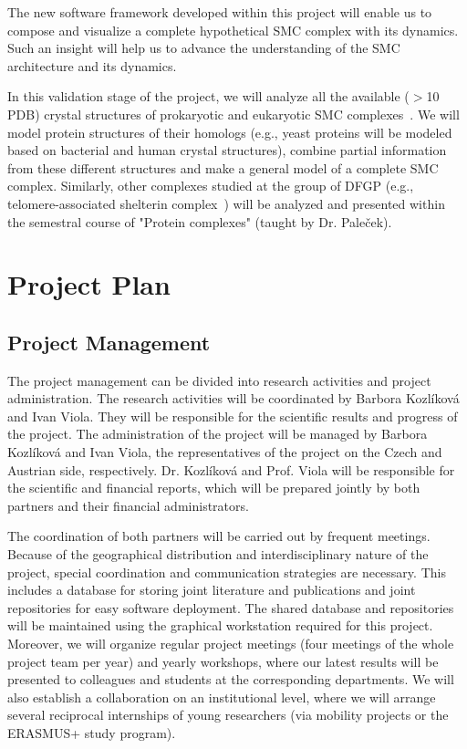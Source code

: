 \documentclass[11pt,a4paper,titlepage,oneside,onecolumn]{article}
\begin{document}
The new software framework developed within this project will enable us to compose and visualize a complete hypothetical SMC complex with its dynamics. 
Such an insight will help us to advance the understanding of the SMC architecture and its dynamics.
 
In this validation stage of the project, we will analyze all the available ($>$10 PDB) crystal structures of prokaryotic and eukaryotic SMC complexes~\cite{Palecek2015}. 
We will model protein structures of their homologs (e.g., yeast proteins will be modeled based on bacterial and human crystal structures), combine partial information from these different structures and make a general model of a complete SMC complex. 
Similarly, other complexes studied at the group of DFGP (e.g., telomere-associated shelterin complex~\cite{Janouskova2015,Schrumpfova}) will be analyzed and presented within the semestral course of "Protein complexes" (taught by Dr. Pale\v{c}ek).




\section{Project Plan}

\subsection{Project Management}
The project management can be divided into research activities and project administration.
The research activities will be coordinated by Barbora Kozl\'{i}kov\'{a} and Ivan Viola. 
They will be responsible for the scientific results and progress of the project.
The administration of the project will be managed by Barbora Kozl\'{i}kov\'{a} and Ivan Viola, the representatives of the project on the Czech and Austrian side, respectively. 
Dr. Kozl\'{i}kov\'{a} and Prof. Viola will be responsible for the scientific and financial reports, which will be prepared jointly by both partners and their financial administrators. 

The coordination of both partners will be carried out by frequent meetings. 
Because of the geographical distribution and interdisciplinary nature of the project, special coordination and communication strategies are necessary. 
This includes a database for storing joint literature and publications and joint repositories for easy software deployment. 
The shared database and repositories will be maintained using the graphical workstation required for this project. 
Moreover, we will organize regular project meetings (four meetings of the whole project team per year) and yearly workshops, where our latest results will be presented to colleagues and students at the corresponding departments. 
We will also establish a collaboration on an institutional level, where we will arrange several reciprocal internships of young researchers (via mobility projects or the ERASMUS+ study program). 
 
\end{document}

